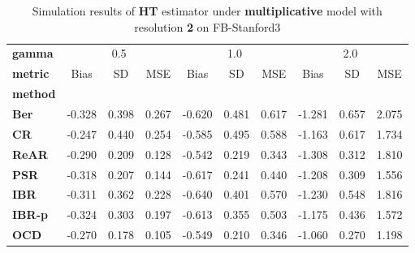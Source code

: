 \begin{table}
\centering
\caption{Simulation results of \textbf{HT} estimator under \textbf{multiplicative} model with resolution \textbf{2} on FB-Stanford3}
\begin{tabular}{lccccccccc}
\toprule
\textbf{gamma} & \multicolumn{3}{c}{0.5} & \multicolumn{3}{c}{1.0} & \multicolumn{3}{c}{2.0} \\
\textbf{metric} &   Bias &     SD &    MSE &   Bias &     SD &    MSE &   Bias &     SD &    MSE \\
\textbf{method} &        &        &        &        &        &        &        &        &        \\
\midrule
\textbf{Ber} & -0.328 &  0.398 &  0.267 & -0.620 &  0.481 &  0.617 & -1.281 &  0.657 &  2.075 \\
\textbf{CR} & -0.247 &  0.440 &  0.254 & -0.585 &  0.495 &  0.588 & -1.163 &  0.617 &  1.734 \\
\textbf{ReAR} & -0.290 &  0.209 &  0.128 & -0.542 &  0.219 &  0.343 & -1.308 &  0.312 &  1.810 \\
\textbf{PSR} & -0.318 &  0.207 &  0.144 & -0.617 &  0.241 &  0.440 & -1.208 &  0.309 &  1.556 \\
\textbf{IBR} & -0.311 &  0.362 &  0.228 & -0.640 &  0.401 &  0.570 & -1.230 &  0.548 &  1.816 \\
\textbf{IBR-p} & -0.324 &  0.303 &  0.197 & -0.613 &  0.355 &  0.503 & -1.175 &  0.436 &  1.572 \\
\textbf{OCD} & -0.270 &  0.178 &  0.105 & -0.549 &  0.210 &  0.346 & -1.060 &  0.270 &  1.198 \\
\bottomrule
\end{tabular}
\end{table}
